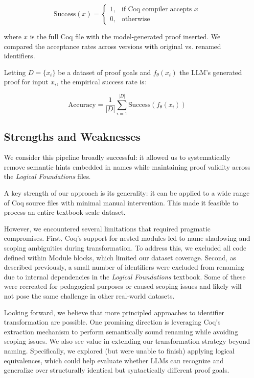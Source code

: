 \[
\text{Success}(x) =
\begin{cases}
1, & \text{if Coq compiler accepts } x \\
0, & \text{otherwise}
\end{cases}
\]

\noindent where \( x \) is the full Coq file with the model-generated proof inserted. We compared the acceptance rates across versions with original vs. renamed identifiers.

Letting \( D = \{x_i\} \) be a dataset of proof goals and \( f_\theta(x_i) \) the LLM's generated proof for input \( x_i \), the empirical success rate is:

\[
\text{Accuracy} = \frac{1}{|D|} \sum_{i=1}^{|D|} \text{Success}(f_\theta(x_i))
\]

\subsection{Strengths and Weaknesses}
We consider this pipeline broadly successful: it allowed us to systematically remove semantic hints embedded in names while maintaining proof validity across the \textit{Logical Foundations} files.

A key strength of our approach is its generality: it can be applied to a wide range of Coq source files with minimal manual intervention. This made it feasible to process an entire textbook-scale dataset.

However, we encountered several limitations that required pragmatic compromises.
First, Coq's support for nested modules led to name shadowing and scoping ambiguities during transformation.
To address this, we excluded all code defined within Module blocks, which limited our dataset coverage.
Second, as described previously, a small number of identifiers were excluded from renaming due to internal dependencies in the \textit{Logical Foundations} textbook. Some of these were recreated for pedagogical purposes or caused scoping issues and likely will not pose the same challenge in other real-world datasets.

Looking forward, we believe that more principled approaches to identifier transformation are possible. One promising direction is leveraging Coq's extraction mechanism to perform semantically sound renaming while avoiding scoping issues.
We also see value in extending our transformation strategy beyond naming.
Specifically, we explored (but were unable to finish) applying logical equivalences, which could help evaluate whether LLMs can recognize and generalize over structurally identical but syntactically different proof goals.

